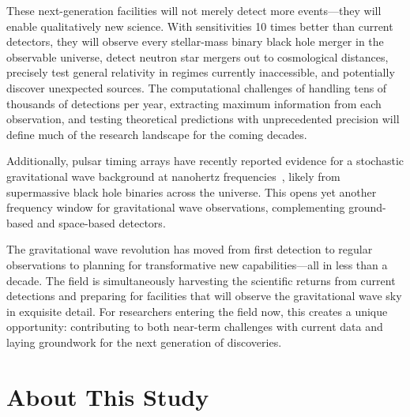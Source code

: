These next-generation facilities will not merely detect more events—they will enable qualitatively new science.
With sensitivities 10 times better than current detectors, they will observe every stellar-mass binary black hole merger in the observable universe, detect neutron star mergers out to cosmological distances, precisely test general relativity in regimes currently inaccessible, and potentially discover unexpected sources.
The computational challenges of handling tens of thousands of detections per year, extracting maximum information from each observation, and testing theoretical predictions with unprecedented precision will define much of the research landscape for the coming decades.


Additionally, pulsar timing arrays have recently reported evidence for a stochastic gravitational wave background at nanohertz frequencies~\cite{agazie_nanograv_2023,eptacollaborationandinptacollaboration:_second_2023,thefermi-latcollaboration*+_gammaray_2022}, likely from supermassive black hole binaries across the universe.
This opens yet another frequency window for gravitational wave observations, complementing ground-based and space-based detectors.


The gravitational wave revolution has moved from first detection to regular observations to planning for transformative new capabilities—all in less than a decade.
The field is simultaneously harvesting the scientific returns from current detections and preparing for facilities that will observe the gravitational wave sky in exquisite detail.
For researchers entering the field now, this creates a unique opportunity: contributing to both near-term challenges with current data and laying groundwork for the next generation of discoveries.


\section{About This Study}\label{sec:about-this-study}


